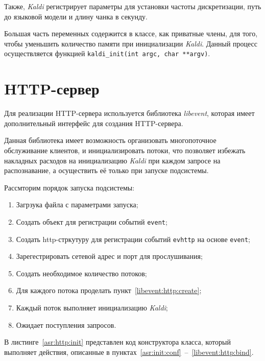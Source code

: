 Также, \textit{Kaldi} регистрирует параметры для установки частоты дискретизации,
путь до языковой модели и длину чанка в секунду.

Большая часть переменных содержится в классе, как приватные члены, для того, чтобы
уменьшить количество памяти при инициализации \textit{Kaldi}.
Данный процесс осуществляется функцией \texttt{kaldi\_init(int argc, char **argv)}.
\section{HTTP-сервер}

Для реализации HTTP-сервера используется библиотека \textit{libevent}, которая
имеет дополнительный интерфейс для создания HTTP-сервера.

Данная библиотека имеет возможность организовать многопоточное обслуживание клиентов,
и инициализировать потоки, что позволяет избежать накладных расходов на инициализацию
\textit{Kaldi} при каждом запросе на распознавание, а осуществить её только
при запуске подсистемы.

Рассмторим порядок запуска подсистемы:
\begin{enumerate}
    \item Загрзука файла с параметрами запуска;\label{asr:init:conf}
    \item Создать объект для регистрации событий \texttt{event};\label{libevent:event:create}
    \item Создать http-стркутуру для регистрации событий \texttt{evhttp}
        на основе \texttt{event};\label{libevent:http:create}
    \item Зарегестрировать сетевой адрес и порт для прослушивания;\label{libevent:http:bind}
    \item Создать необходимое количество потоков;
    \item Для каждого потока проделать пункт~\ref{libevent:http:create};
    \item Каждый поток выполняет инициализацию \textit{Kaldi};
    \item Ожидает поступления запросов.
\end{enumerate}

В листинге~\ref{asr:http:init} представлен код конструктора класса, который
выполняет действия, описанные в пунктах~\ref{asr:init:conf}~--~\ref{libevent:http:bind}.


